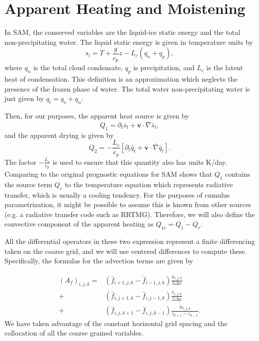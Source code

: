 \documentclass{report}
\begin{document}
\section{Apparent Heating and Moistening}
\label{sec:q1q2}

In SAM, the conserved variables are the liquid-ice static energy and the total non-precipitating water. The liquid static energy is given in temperature units by 
\[ s_l = T + \frac{g}{c_p} z - L_c(q_n + q_p),\]
where $q_n$ is the total cloud condensate, $q_p$ is precipitation, and $L_c$ is the latent heat of condensation. This definition is an approximation which neglects the presence of the frozen phase of water. The total water non-precipitating water is just given by 
$q_t = q_v + q_n.$

Then, for our purposes, the apparent heat source is given by
\[Q_1 = \partial_t {\bar{s}_l} + \overline{ \mathbf{v} }\cdot \overline{\nabla} \bar{s}_l, \]
and the apparent drying is given by
\[Q_2 = - \frac{L_c}{c_p} \left[\partial_t {\bar{q}_t} +\overline{ \mathbf{v} } \cdot \overline{\nabla} \bar{q}_t\right].\]
The factor $-\frac{L_c}{c_p}$ is used to ensure that this quantity also has units K/day. Comparing to the original prognostic equations for SAM shows that $Q_1$ contains the source term  $Q_r$ to the temperature equation which represents radiative transfer, which is usually a cooling tendency. For the purposes of cumulus parametrization, it might be possible to assume this is known from other sources (e.g. a radiative transfer code such as RRTMG). Therefore, we will also define the convective component of the apparent heating as $Q_{1c} = Q_1 - Q_r$. 

All the differential operators in these two expression represent a finite
differencing taken on the coarse grid, and we will use centered differences to
compute these. Specifically, the formulas for the advection terms are given
by
\renewcommand{\bf}{\bar{f}_{i,j}}


\begin{align}
  (A_f)_{i,j,k} = &\left( \bar{f}_{i+1,j,k} - \bar{f}_{i-1,j,k} \right) \frac{\bar{u}_{i,j,k}}{2 \Delta x}\\
              +&\left( \bar{f}_{i,j+1,k} - \bar{f}_{i,j-1,k} \right) \frac{\bar{v}_{i,j,k}}{2 \Delta y}\nonumber\\
              +& \left(  \bar{f}_{i,j,k+1} - \bar{f}_{i,j,k-1} \right) \frac{\bar{w}_{i,j,k}}{z_{k+1} - z_{k-1}}.\nonumber
\end{align}
We have taken advantage of the constant horizontal grid spacing and the
collocation of all the coarse grained variables.
\end{document}

